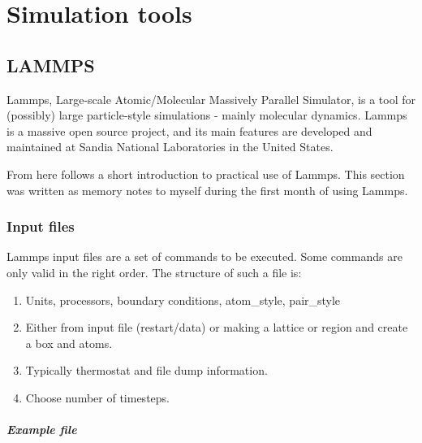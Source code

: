 \chapter{Simulation tools}

\section{LAMMPS}
Lammps, Large-scale Atomic/Molecular Massively Parallel Simulator, is a tool for (possibly) large particle-style simulations - mainly molecular dynamics. Lammps is a massive open source project, and its main features are developed and maintained at Sandia National Laboratories in the United States. 

From here follows a short introduction to practical use of Lammps. This section was written as memory notes to myself during the first month of using Lammps. 

\subsection{Input files}
Lammps input files are a set of commands to be executed. Some commands are only valid in the right order. The structure of such a file is:

\begin{enumerate}
\item {} Units, processors, boundary conditions, atom\_style, pair\_style
\item {} Either from input file (restart/data) or making a lattice or region and create a box and atoms. 
\item {} Typically thermostat and file dump information.
\item {} Choose number of timesteps.
\end{enumerate}
\paragraph{Example file}

